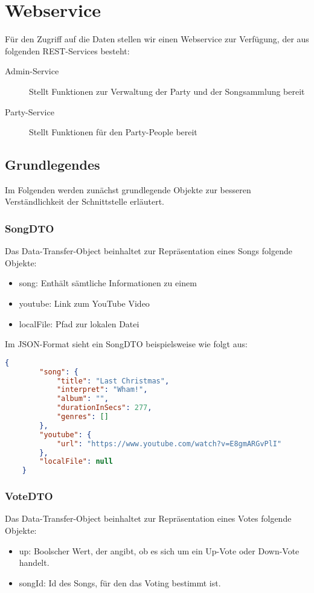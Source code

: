 \section{Webservice}
\label{cha:Webservice}
Für den Zugriff auf die Daten stellen wir einen Webservice zur Verfügung, der aus folgenden REST-Services besteht:

\begin{description}
\item [Admin-Service] Stellt Funktionen zur Verwaltung der Party und der Songsammlung bereit
\item [Party-Service] Stellt Funktionen für den Party-People bereit
\end{description}


\subsection{Grundlegendes}
Im Folgenden werden zunächst grundlegende Objekte zur besseren Verständlichkeit der Schnittstelle erläutert.

\subsubsection{SongDTO}
\label{object:SongDTO}
Das Data-Transfer-Object beinhaltet zur Repräsentation eines Songs folgende Objekte:
\begin{itemize}
\item song: Enthält sämtliche Informationen zu einem 
\item{youtube: Link zum YouTube Video}
\item{localFile: Pfad zur lokalen Datei}
\end{itemize}

Im JSON-Format sieht ein SongDTO beispielsweise wie folgt aus:

\begin{lstlisting}[language=json]
    {
        "song": {
            "title": "Last Christmas",
            "interpret": "Wham!",
            "album": "",
            "durationInSecs": 277,
            "genres": []
        },
        "youtube": {
            "url": "https://www.youtube.com/watch?v=E8gmARGvPlI"
        },
        "localFile": null
    }
\end{lstlisting}

\subsubsection{VoteDTO}
\label{object:VoteDTO}
Das Data-Transfer-Object beinhaltet zur Repräsentation eines Votes folgende Objekte:
\begin{itemize}
\item{up: Boolscher Wert, der angibt, ob es sich um ein Up-Vote oder Down-Vote handelt.}
\item{songId: Id des Songs, für den das Voting bestimmt ist.}
\end{itemize}

